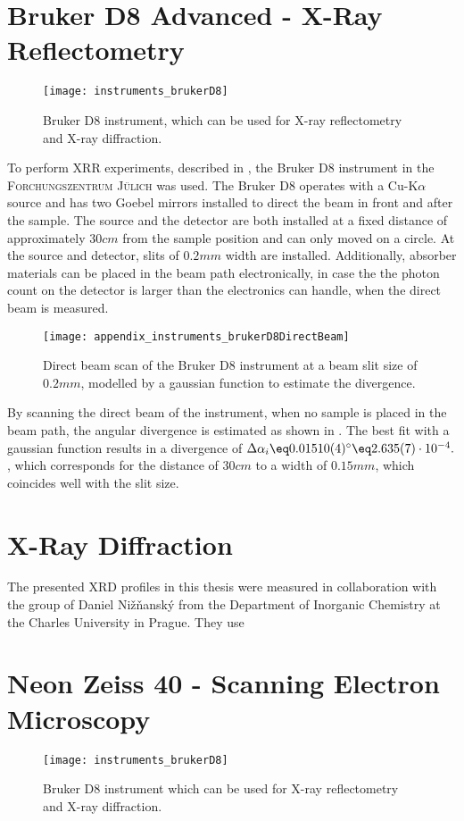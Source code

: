 \documentclass[\main/dresen_thesis.tex]{subfiles}
\begin{document}
  \section{Bruker D8 Advanced - X-Ray Reflectometry}
  \label{app:additionalExperimentalTechniques:xrr}
  \begin{figure}[ht]
    \centering
    \texttt{[image: instruments\_brukerD8]}
    \caption{\label{fig:appendix:instruments:brukerD8}Bruker D8 instrument, which can be used for X-ray reflectometry and X-ray diffraction.}
  \end{figure}
  To perform XRR experiments, described in , the Bruker D8 instrument in the \textsc{Forchungszentrum J\"ulich} was used.
  The Bruker D8 operates with a Cu-K$\alpha$ source and has two Goebel mirrors installed to direct the beam in front and after the sample.
  The source and the detector are both installed at a fixed distance of approximately $30 \unit{cm}$ from the sample position and can only moved on a circle.
  At the source and detector, slits of $0.2 \unit{mm}$ width are installed.
  Additionally, absorber materials can be placed in the beam path electronically, in case the the photon count on the detector is larger than the electronics can handle, \eg when the direct beam is measured.

  \begin{figure}[ht]
    \centering
    \texttt{[image: appendix\_instruments\_brukerD8DirectBeam]}
    \caption{\label{fig:appendix:instruments:brukerD8DirectBeam}Direct beam scan of the Bruker D8 instrument at a beam slit size of $0.2 \unit{mm}$, modelled by a gaussian function to estimate the divergence.}
  \end{figure}

  By scanning the direct beam of the instrument, when no sample is placed in the beam path, the angular divergence is estimated as shown in .
  The best fit with a gaussian function results in a divergence of $\Delta \alpha_i \eq 0.01510(4) ^\circ \eq 2.635(7) \cdot 10^{-4}.$, which corresponds for the distance of $30 \unit{cm}$ to a width of $0.15 \unit{mm}$, which coincides well with the slit size.


  \section{X-Ray Diffraction}
  \label{app:additionalExperimentalTechniques:xrd}
  The presented XRD profiles in this thesis were measured in collaboration with the group of Daniel Nižňanský from the Department of Inorganic Chemistry at the Charles University in Prague.
  They use 

  \section{Neon Zeiss 40 - Scanning Electron Microscopy}
  \label{app:additionalExperimentalTechniques:sem}
  \begin{figure}[ht]
    \centering
    \texttt{[image: instruments\_brukerD8]}
    \caption{\label{fig:appendix:instruments:SEM}Bruker D8 instrument which can be used for X-ray reflectometry and X-ray diffraction.}
  \end{figure}
\end{document}
